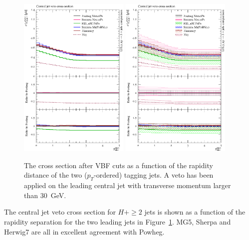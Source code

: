 \begin{figure}[t!]
  \centering
  \includegraphics[width=0.47\textwidth]{figures/hjetscomp_u_xs_central_jet_veto_VBF.pdf}
  \hfill
  \includegraphics[width=0.47\textwidth]{figures/hjetscomp_xs_central_jet_veto_VBF.pdf}
  \caption{
    The cross section after VBF cuts as a function of the rapidity
    distance of the two ($p_T$-ordered) tagging jets. A veto has been
    applied on the leading central jet with transverse momentum larger
    than 30~GeV.
    \label{fig:higgscomp:results:jvobs:cjvxsvbf}
  }
\end{figure}

The central jet veto cross section for $H+\ge2$ jets is shown as a
function of the rapidity separation for the two leading jets in
Figure~\ref{fig:higgscomp:results:jvobs:cjvxsvbf}. MG5, Sherpa and
Herwig7 are all in excellent agreement with Powheg.
